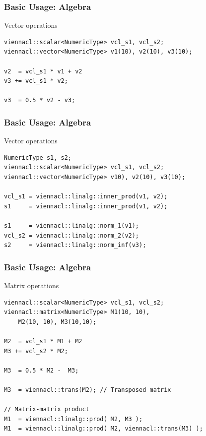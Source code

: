 \begin{frame}[fragile]
\frametitle{Basic Usage: Algebra}

\begin{block}{Vector operations}
  \begin{lstlisting}
viennacl::scalar<NumericType> vcl_s1, vcl_s2;
viennacl::vector<NumericType> v1(10), v2(10), v3(10);

v2  = vcl_s1 * v1 + v2
v3 += vcl_s1 * v2;

v3  = 0.5 * v2 - v3;
  \end{lstlisting}
\end{block}

\end{frame}



\begin{frame}[fragile]
\frametitle{Basic Usage: Algebra}

\begin{block}{Vector operations}
  \begin{lstlisting}
NumericType s1, s2;
viennacl::scalar<NumericType> vcl_s1, vcl_s2;
viennacl::vector<NumericType> v10), v2(10), v3(10);

vcl_s1 = viennacl::linalg::inner_prod(v1, v2);
s1     = viennacl::linalg::inner_prod(v1, v2);
 
s1     = viennacl::linalg::norm_1(v1);
vcl_s2 = viennacl::linalg::norm_2(v2);
s2     = viennacl::linalg::norm_inf(v3);
  \end{lstlisting}
\end{block}

\end{frame}



\begin{frame}[fragile]
\frametitle{Basic Usage: Algebra}

\begin{block}{Matrix operations}
  \begin{lstlisting}
viennacl::scalar<NumericType> vcl_s1, vcl_s2;
viennacl::matrix<NumericType> M1(10, 10),
    M2(10, 10), M3(10,10);

M2  = vcl_s1 * M1 + M2
M3 += vcl_s2 * M2;

M3  = 0.5 * M2 -  M3;

M3  = viennacl::trans(M2); // Transposed matrix

// Matrix-matrix product
M1  = viennacl::linalg::prod( M2, M3 );
M1  = viennacl::linalg::prod( M2, viennacl::trans(M3) );
  \end{lstlisting}
\end{block}

\end{frame}


